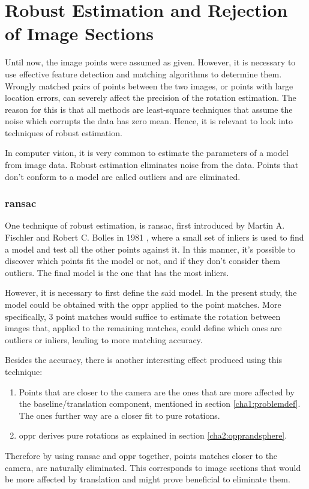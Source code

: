 
\section{Robust Estimation and Rejection of Image Sections}
\label{cha2:robustest}

Until now, the image points were assumed as given. However, it is necessary to use effective feature detection and matching algorithms to determine them. Wrongly matched pairs of points between the two images, or points with large location errors, can severely affect the precision of the rotation estimation. The reason for this is that all methods are least-square techniques that assume the noise which corrupts the data has zero mean. Hence, it is relevant to look into techniques of robust estimation.

In computer vision, it is very common to estimate the parameters of a model from image data. Robust estimation eliminates noise from the data. Points that don’t conform to a model are called outliers and are eliminated.

\subsubsection{\acrlong{ransac}}
\label{fipewnf}
One technique of robust estimation, is \acrfull{ransac}, first introduced by Martin A. Fischler and Robert C. Bolles in 1981 \cite{ransac}, where a small set of inliers is used to find a model and test all the 
other points against it. In this manner, it's possible to discover which points fit the model or not, and if they don’t consider them outliers. The final model is the one that has the most inliers. 

However, it is necessary to first define the said model. In the present study, the model could be obtained with the \acrlong{oppr} applied to the point matches. More specifically, 3 point matches would suffice to estimate the rotation between images that, applied to the remaining matches, could define which ones are outliers or inliers, leading to more matching accuracy.

Besides the accuracy, there is another interesting effect produced using this technique:

\begin{enumerate}
	\item Points that are closer to the camera are the ones that are more affected by the baseline/translation component, mentioned in section \ref{cha1:problemdef}. The ones further way are a closer fit to pure rotations.
	
	\item \acrshort{oppr} derives pure rotations as explained in section \ref{cha2:opprandsphere}. 
\end{enumerate}
Therefore by using \acrshort{ransac} and \acrshort{oppr} together, points matches closer to the camera, are naturally eliminated. This corresponds to image sections that would be more affected by translation and might prove beneficial to eliminate them. \cite{mono} \\

